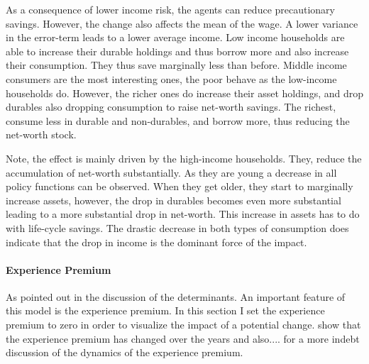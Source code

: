 \documentclass[12pt,a4paper,leqno]{article}
\theoremstyle{definition}
\begin{document}
As a consequence of lower income risk, the agents can reduce precautionary savings. However, the change also affects the mean of the wage. A lower variance in the error-term leads to a lower average income. 
Low income households are able to increase their durable holdings and thus borrow more and also increase their consumption. They thus save marginally less than before. Middle income consumers are the most interesting ones, the poor behave as the low-income households do. However, the richer ones do increase their asset holdings, and drop durables also dropping consumption to raise net-worth savings. The richest, consume less in durable and non-durables, and borrow more, thus reducing the net-worth stock. 

Note, the effect is mainly driven by the high-income households. They, reduce the accumulation of net-worth substantially. As they are young a decrease in all policy functions can be observed. When they get older, they start to marginally increase assets, however, the drop in durables becomes even more substantial leading to a more substantial drop in net-worth. This increase in assets has to do with life-cycle savings. The drastic decrease in both types of consumption does indicate that the drop in income is the dominant force of the impact. 

\paragraph{Experience Premium}
As pointed out in the discussion of the determinants. An important feature of this model is the experience premium. In this section I set the experience premium to zero in order to visualize the impact of a potential change. \cite{hintermaier2011} show that the experience premium has changed over the years and also.... for a more indebt discussion of the dynamics of the experience premium. 
\end{document}
